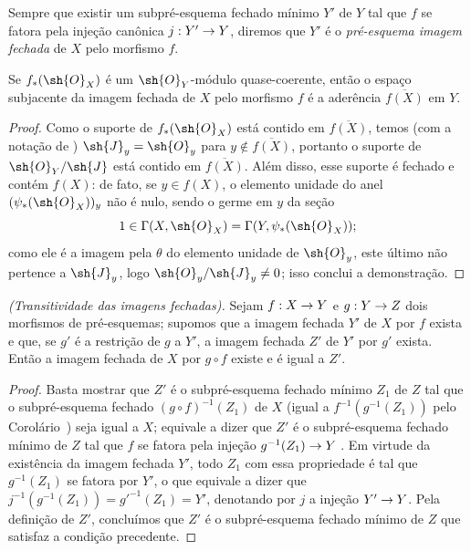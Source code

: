 \documentclass[oneside]{amsart}
\makeatletter
\newcommand{\ega@arrow}[2]{\mathchoice{#1}{#2}{#2}{#2}}
\renewcommand{\to}{\ega@arrow{\longrightarrow}{\rightarrow}}
\let\EGAOriginalLabel\label
\renewcommand{\label}[1]{\phantomsection\EGAOriginalLabel{#1}}
\makeatother
\begin{document}
\begin{definition}[9.5.3]
\label{I.9.5.3}
Sempre que existir um subpré-esquema fechado mínimo $Y'$ de $Y$ tal que $f$ se fatora
pela injeção canônica $j:Y'\to Y$, diremos que $Y'$ é o
\emph{pré-esquema imagem fechada} de $X$ pelo morfismo $f$.
\end{definition}

\begin{proposition}[9.5.4]
\label{I.9.5.4}
Se $f_*(\sh{O}_X)$ é um $\sh{O}_Y$-módulo quase-coerente, então o espaço subjacente
da imagem fechada de $X$ pelo morfismo $f$ é a aderência $\overline{f(X)}$ em $Y$.
\end{proposition}

\begin{proof}
Como o suporte de $f_*(\sh{O}_X)$ está contido em $\overline{f(X)}$, temos (com
a notação de ) $\sh{J}_y=\sh{O}_y$ para
$y\not\in\overline{f(X)}$, portanto o suporte de $\sh{O}_Y/\sh{J}$ está contido em
$\overline{f(X)}$. Além disso, esse suporte é fechado e contém $f(X)$:
de fato, se $y\in f(X)$, o elemento unidade do anel $(\psi_*(\sh{O}_X))_y$ não é
nulo, sendo o germe em $y$ da seção
\[
  1\in\Gamma(X,\sh{O}_X)=\Gamma(Y,\psi_*(\sh{O}_X));
\]
como ele é a imagem pela $\theta$ do elemento unidade de $\sh{O}_y$, este último
não pertence a $\sh{J}_y$, logo $\sh{O}_y/\sh{J}_y\neq 0$; isso conclui a
demonstração.
\end{proof}

\begin{proposition}[9.5.5]
\label{I.9.5.5}
\emph{(Transitividade das imagens fechadas).} Sejam $f:X\to Y$ e $g:Y\to Z$ dois
morfismos de pré-esquemas; supomos que a imagem fechada $Y'$ de $X$ por $f$ exista e que,
se $g'$ é a restrição de $g$ a $Y'$, a imagem fechada $Z'$ de $Y'$ por $g'$ exista.
Então a imagem fechada de $X$ por $g\circ f$ existe e é igual a $Z'$.
\end{proposition}

\begin{proof}
Basta  mostrar que $Z'$ é o subpré-esquema fechado mínimo
$Z_1$ de $Z$ tal que o subpré-esquema fechado $(g\circ f)^{-1}(Z_1)$ de $X$
(igual a $f^{-1}(g^{-1}(Z_1))$ pelo Corolário~) seja igual a
$X$; equivale a dizer que $Z'$ é o subpré-esquema fechado mínimo de $Z$ tal que
$f$ se fatora pela injeção $g^{-1}(Z_1)\to Y$ . Em virtude da
existência da imagem fechada $Y'$, todo $Z_1$ com essa propriedade é tal que
$g^{-1}(Z_1)$ se fatora por $Y'$, o que equivale a dizer que
$j^{-1}(g^{-1}(Z_1))=g'^{-1}(Z_1)=Y'$, denotando por $j$ a injeção
$Y'\to Y$. Pela definição de $Z'$, concluímos que $Z'$ é o subpré-esquema fechado
mínimo de $Z$ que satisfaz a condição precedente.
\end{proof}
\end{document}
